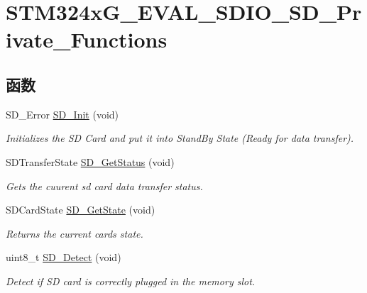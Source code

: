 \hypertarget{group___s_t_m324x_g___e_v_a_l___s_d_i_o___s_d___private___functions}{}\section{S\+T\+M324x\+G\+\_\+\+E\+V\+A\+L\+\_\+\+S\+D\+I\+O\+\_\+\+S\+D\+\_\+\+Private\+\_\+\+Functions}
\label{group___s_t_m324x_g___e_v_a_l___s_d_i_o___s_d___private___functions}
\subsection*{函数}
\begin{DoxyCompactItemize}
\item 
S\+D\+\_\+\+Error \hyperlink{group___s_t_m324x_g___e_v_a_l___s_d_i_o___s_d___private___functions_ga3c927d4d98ffb6f3cc2442b09c19926c}{S\+D\+\_\+\+Init} (void)
\begin{DoxyCompactList}\small\item\em Initializes the SD Card and put it into Stand\+By State (Ready for data transfer). \end{DoxyCompactList}\item 
S\+D\+Transfer\+State \hyperlink{group___s_t_m324x_g___e_v_a_l___s_d_i_o___s_d___private___functions_gaf3f228aaee7b2b18acc056b2f27ca3f7}{S\+D\+\_\+\+Get\+Status} (void)
\begin{DoxyCompactList}\small\item\em Gets the cuurent sd card data transfer status. \end{DoxyCompactList}\item 
S\+D\+Card\+State \hyperlink{group___s_t_m324x_g___e_v_a_l___s_d_i_o___s_d___private___functions_ga1c49d266e4f9ba33b7a425361a30d227}{S\+D\+\_\+\+Get\+State} (void)
\begin{DoxyCompactList}\small\item\em Returns the current card\textquotesingle{}s state. \end{DoxyCompactList}\item 
uint8\+\_\+t \hyperlink{group___s_t_m324x_g___e_v_a_l___s_d_i_o___s_d___private___functions_gacb7415873dffa26068c5e46025efebfa}{S\+D\+\_\+\+Detect} (void)
\begin{DoxyCompactList}\small\item\em Detect if SD card is correctly plugged in the memory slot. \end{DoxyCompactList}\item 

\end{DoxyCompactItemize}
